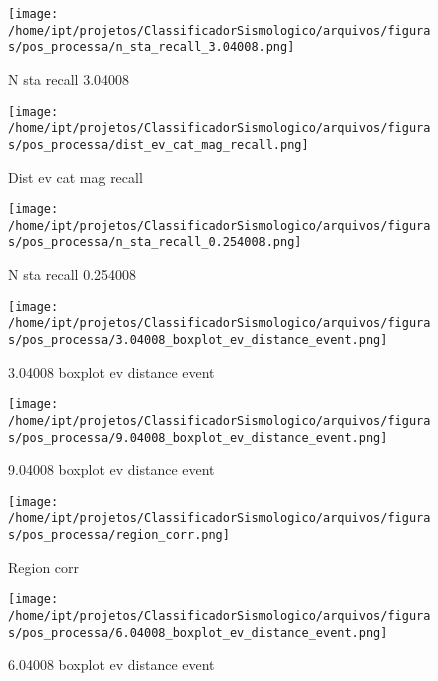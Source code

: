     \begin{figure}[H]
        \centering
        \texttt{[image: /home/ipt/projetos/ClassificadorSismologico/arquivos/figuras/pos\_processa/n\_sta\_recall\_3.04008.png]}
        \caption{N sta recall 3.04008}
        \label{fig:n_sta_recall_3.04008}
    \end{figure}
                

    \begin{figure}[H]
        \centering
        \texttt{[image: /home/ipt/projetos/ClassificadorSismologico/arquivos/figuras/pos\_processa/dist\_ev\_cat\_mag\_recall.png]}
        \caption{Dist ev cat mag recall}
        \label{fig:dist_ev_cat_mag_recall}
    \end{figure}
                

    \begin{figure}[H]
        \centering
        \texttt{[image: /home/ipt/projetos/ClassificadorSismologico/arquivos/figuras/pos\_processa/n\_sta\_recall\_0.254008.png]}
        \caption{N sta recall 0.254008}
        \label{fig:n_sta_recall_0.254008}
    \end{figure}
                

    \begin{figure}[H]
        \centering
        \texttt{[image: /home/ipt/projetos/ClassificadorSismologico/arquivos/figuras/pos\_processa/3.04008\_boxplot\_ev\_distance\_event.png]}
        \caption{3.04008 boxplot ev distance event}
        \label{fig:3.04008_boxplot_ev_distance_event}
    \end{figure}
                

    \begin{figure}[H]
        \centering
        \texttt{[image: /home/ipt/projetos/ClassificadorSismologico/arquivos/figuras/pos\_processa/9.04008\_boxplot\_ev\_distance\_event.png]}
        \caption{9.04008 boxplot ev distance event}
        \label{fig:9.04008_boxplot_ev_distance_event}
    \end{figure}
                

    \begin{figure}[H]
        \centering
        \texttt{[image: /home/ipt/projetos/ClassificadorSismologico/arquivos/figuras/pos\_processa/region\_corr.png]}
        \caption{Region corr}
        \label{fig:region_corr}
    \end{figure}
                

    \begin{figure}[H]
        \centering
        \texttt{[image: /home/ipt/projetos/ClassificadorSismologico/arquivos/figuras/pos\_processa/6.04008\_boxplot\_ev\_distance\_event.png]}
        \caption{6.04008 boxplot ev distance event}
        \label{fig:6.04008_boxplot_ev_distance_event}
    \end{figure}
                

